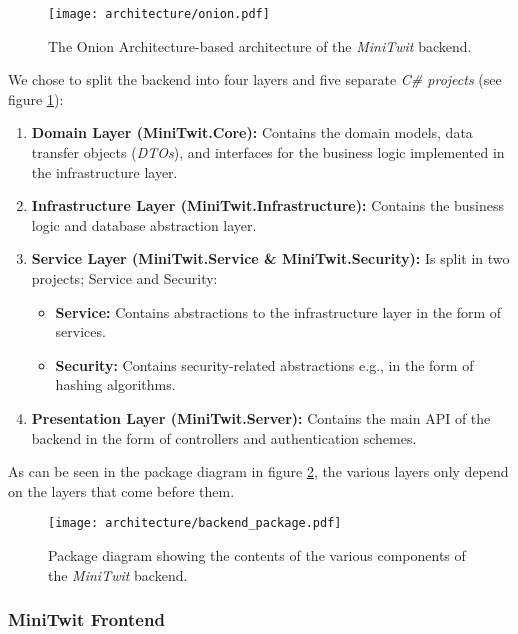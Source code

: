 \begin{figure}[H]
    \centering
    \texttt{[image: architecture/onion.pdf]}
    \caption{The Onion Architecture-based architecture of the \textit{MiniTwit} backend.}
    \label{fig:backend-onion}
\end{figure}
\vspace{-0.3cm}

We chose to split the backend into four layers and five separate \textit{C\# projects} (see figure \ref{fig:backend-onion}):

\begin{enumerate}
    \item \textbf{Domain Layer (MiniTwit.Core):} Contains the domain models, data transfer objects (\textit{DTOs}), and interfaces for the business logic implemented in the infrastructure layer.
    \item \textbf{Infrastructure Layer (MiniTwit.Infrastructure):} Contains the business logic and database abstraction layer.
    \item \textbf{Service Layer (MiniTwit.Service \& MiniTwit.Security):} Is split in two projects; Service and Security:
    \begin{itemize}[$\circ$]
        \item \textbf{Service:} Contains abstractions to the infrastructure layer in the form of services.
        \item \textbf{Security:} Contains security-related abstractions e.g., in the form of hashing algorithms.
    \end{itemize}
    \item \textbf{Presentation Layer (MiniTwit.Server):} Contains the main API of the backend in the form of controllers and authentication schemes.
\end{enumerate}

As can be seen in the package diagram in figure \ref{fig:backend-architecture}, the various layers only depend on the layers that come before them.

\begin{figure}[H]
    \centering
    \texttt{[image: architecture/backend\_package.pdf]}
    \caption{Package diagram showing the contents of the various components of the \textit{MiniTwit} backend.}
    \label{fig:backend-architecture}
\end{figure}

\subsubsection{MiniTwit Frontend}

